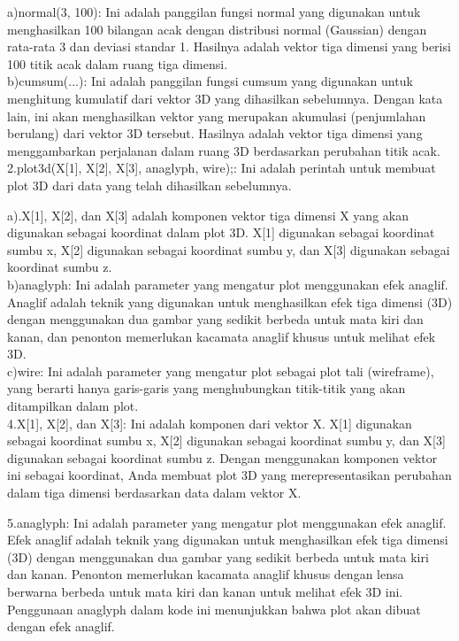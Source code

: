 \documentclass[a4paper,10pt]{article}
\begin{document}
\begin{eulernotebook}
\begin{eulercomment}
\begin{eulercomment}
\begin{eulercomment}
\begin{eulercomment}
\begin{eulercomment}
\begin{eulercomment}
\begin{eulercomment}
\begin{eulercomment}
\begin{eulercomment}
a)normal(3, 100): Ini adalah panggilan fungsi normal yang digunakan
untuk menghasilkan 100 bilangan acak dengan distribusi normal
(Gaussian) dengan rata-rata 3 dan deviasi standar 1. Hasilnya adalah
vektor tiga dimensi yang berisi 100 titik acak dalam ruang tiga
dimensi.\\
b)cumsum(...): Ini adalah panggilan fungsi cumsum yang digunakan untuk
menghitung kumulatif dari vektor 3D yang dihasilkan sebelumnya. Dengan
kata lain, ini akan menghasilkan vektor yang merupakan akumulasi
(penjumlahan berulang) dari vektor 3D tersebut. Hasilnya adalah vektor
tiga dimensi yang menggambarkan perjalanan dalam ruang 3D berdasarkan
perubahan titik acak.\\
2.plot3d(X[1], X[2], X[3], anaglyph, wire);: Ini adalah perintah untuk
membuat plot 3D dari data yang telah dihasilkan sebelumnya.

a).X[1], X[2], dan X[3] adalah komponen vektor tiga dimensi X yang
akan digunakan sebagai koordinat dalam plot 3D. X[1] digunakan sebagai
koordinat sumbu x, X[2] digunakan sebagai koordinat sumbu y, dan X[3]
digunakan sebagai koordinat sumbu z.\\
b)anaglyph: Ini adalah parameter yang mengatur plot menggunakan efek
anaglif. Anaglif adalah teknik yang digunakan untuk menghasilkan efek
tiga dimensi (3D) dengan menggunakan dua gambar yang sedikit berbeda
untuk mata kiri dan kanan, dan penonton memerlukan kacamata anaglif
khusus untuk melihat efek 3D.\\
c)wire: Ini adalah parameter yang mengatur plot sebagai plot tali
(wireframe), yang berarti hanya garis-garis yang menghubungkan
titik-titik yang akan ditampilkan dalam plot.\\
4.X[1], X[2], dan X[3]: Ini adalah komponen dari vektor X. X[1]
digunakan sebagai koordinat sumbu x, X[2] digunakan sebagai koordinat
sumbu y, dan X[3] digunakan sebagai koordinat sumbu z. Dengan
menggunakan komponen vektor ini sebagai koordinat, Anda membuat plot
3D yang merepresentasikan perubahan dalam tiga dimensi berdasarkan
data dalam vektor X.

5.anaglyph: Ini adalah parameter yang mengatur plot menggunakan efek
anaglif. Efek anaglif adalah teknik yang digunakan untuk menghasilkan
efek tiga dimensi (3D) dengan menggunakan dua gambar yang sedikit
berbeda untuk mata kiri dan kanan. Penonton memerlukan kacamata
anaglif khusus dengan lensa berwarna berbeda untuk mata kiri dan kanan
untuk melihat efek 3D ini. Penggunaan anaglyph dalam kode ini
menunjukkan bahwa plot akan dibuat dengan efek anaglif.


\end{eulercomment}
\end{eulercomment}
\end{eulercomment}
\end{eulercomment}
\end{eulercomment}
\end{eulercomment}
\end{eulercomment}
\end{eulercomment}
\end{eulercomment}
\end{eulernotebook}
\end{document}
